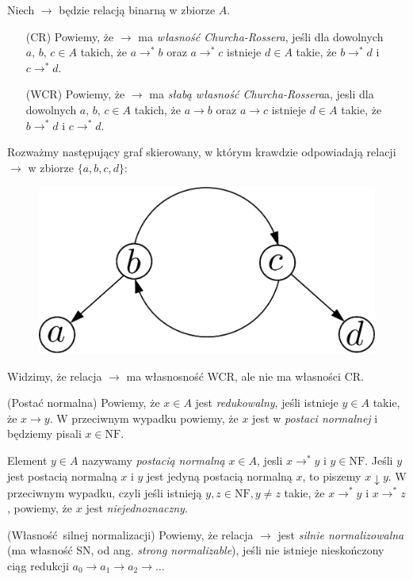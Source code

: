\begin{definicja}
  Niech \(\to\) będzie relacją binarną w zbiorze \(A\). 
\begin{enumerate}
  \setlength\itemsep{0em}
  \item[(CR) ] Powiemy, że \(\to\) ma \emph{własność Churcha-Rossera}, jeśli
               dla dowolnych \(a,\,b,\,c\in A\) takich, że
               \(a\to^{*}b\) oraz \(a\to^{*} c\) istnieje \(d\in A\)
               takie, że \(b\to^{*} d\) i \(c\to^{*} d\).

  \item[(WCR)] Powiemy, że \(\to\) ma \emph{słabą własność 
               Churcha-Rossera}a, jesli dla dowolnych \(a,\,b,\,c\in A\)
               takich, że \(a\to b\) oraz \(a\to c\) istnieje \(d\in A\) 
               takie, że \(b\to^{*} d\) i \(c\to^{*} d\).
\end{enumerate}
\end{definicja}
\begin{uwaga*}
  Rozważmy następujący graf skierowany, w którym krawdzie odpowiadają relacji \(\to\) w zbiorze \(\{a,b,c,d\}\):
  \begin{figure}[h]
    \centering
    \includegraphics[width=0.32\linewidth]{../wcrnotcr_example}
  \end{figure}

  Widzimy, że relacja \(\to\) ma własnosność WCR, ale nie ma własności CR.
\end{uwaga*}
\begin{definicja}(Postać normalna)
  Powiemy, że \(x\in A\) jest \emph{redukowalny}, jeśli istnieje \(y\in A\) takie, że \(x\to y\). W przeciwnym wypadku powiemy, że \(x\) jest w \emph{postaci normalnej} i będziemy pisali \(x\in\mathrm{NF}\). 
  
  Element \(y\in A\) nazywamy \emph{postacią normalną} \(x\in A\), jesli \(x\to^{*}y\) i \(y\in\mathrm{NF}\). Jeśli \(y\) jest postacią normalną \(x\) i \(y\) jest jedyną postacią normalną \(x\), to piszemy \(x\downarrow y\). W przeciwnym wypadku, czyli jeśli istnieją \(y, z\in \mathrm{NF}, y\neq z\) takie, że \(x\to^{*} y\) i \(x\to^{*} z\), powiemy, że \(x\) jest \emph{niejednoznaczny}. 
\end{definicja}

\begin{definicja}(Własność silnej normalizacji)
  Powiemy, że relacja \(\to\) jest \emph{silnie normalizowalna} (ma własność SN, od ang. \emph{strong normalizable}), jeśli nie istnieje nieskończony ciąg redukcji \(a_0 \to a_1 \to a_2 \to \dots\)
\end{definicja}

